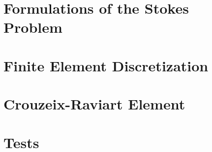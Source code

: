\documentclass[12pt]{article}
\title{\reporttitle}
\author{Andrea Di Antonio, 858798 \\ \hyperlink{mailto:a.diantonio1@campus.unimib.it}{a.diantonio1@campus.unimib.it}}
\date{Exam session of February 22, 2024 \\ Academic Year 2023-24}
\begin{document}
	\maketitle
	\thispagestyle{fancy}

	\begin{abstract}
		\begin{center}
			Report for the course \textit{Metodi Numerici Avanzati per Equazioni alle Derivate Parziali}.
		\end{center}
	\end{abstract}

	\newpage
	\tableofcontents

	\newpage
	\section{Formulations of the Stokes Problem}
	

	\newpage
	\section{Finite Element Discretization}
	

	\newpage
	\section{Crouzeix-Raviart Element}
	

	\newpage
	\section{Tests}
	
\end{document}
